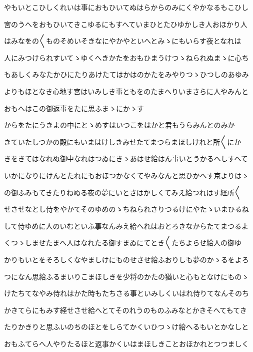 \documentclass[a4paper,11pt,landscape]{ltjtarticle}
\begin{document}
\par\medskip
やもいとこひしくれいは事におもひいてぬはらからのみにくやかなるもこひし
\par\medskip
宮のうへをおもひいてきこゆるにもすへていまひとたひゆかしき人おほかり人
\par\medskip
はみなをの〱ものそめいそきなにやかやといへとみゝにもいらす夜となれは
\par\medskip
人にみつけられすいてゝゆくへきかたをおもひまうけつゝねられぬまゝに心ち
\par\medskip
もあしくみなたかひにたりあけたてはかはのかたをみやりつゝひつしのあゆみ
\par\medskip
よりもほとなき心地す宮はいみしき事ともをのたまへりいまさらに人やみんと
\par\medskip
おもへはこの御返事をたに思ふまゝにかゝす
\par\medskip
からをたにうきよの中にとゝめすはいつこをはかと君もうらみんとのみか
\par\medskip
きていたしつかの殿にもいまはけしきみせたてまつらまほしけれと所〱にか
\par\medskip
きをきてはなれぬ御中なれはつゐにきゝあはせ給はん事いとうかるへしすへて
\par\medskip
いかになりにけんとたれにもおほつかなくてやみなんと思ひかへす京よりはゝ
\par\medskip
の御ふみもてきたりねぬる夜の夢にいとさはかしくてみえ給つれはす経所〱
\par\medskip
せさせなとし侍をやかてそのゆめのゝちねられさりつるけにやたゝいまひるね
\par\medskip
して侍ゆめに人のいむといふ事なんみえ給へれはおとろきなからたてまつるよ
\par\medskip
くつゝしませたまへ人はなれたる御すまゐにてとき〱たちよらせ給人の御ゆ
\par\medskip
かりもいとをそろしくなやましけにものせさせ給ふおりしも夢のかゝるをよろ
\par\medskip
つになん思給ふるまいりこまほしきを少将のかたの猶いと心もとなけにものゝ
\par\medskip
けたちてなやみ侍れはかた時もたちさる事といみしくいはれ侍りてなんそのち
\par\medskip
かきてらにもみす経せさせ給へとてそのれうのものふみなとかきそへてもてき
\par\medskip
たりかきりと思ふいのちのほとをしらてかくいひつゝけ給へるもいとかなしと
\par\medskip
おもふてらへ人やりたるほと返事かくいはまほしきことおほかれとつつましく
\par\medskip
\end{document}

